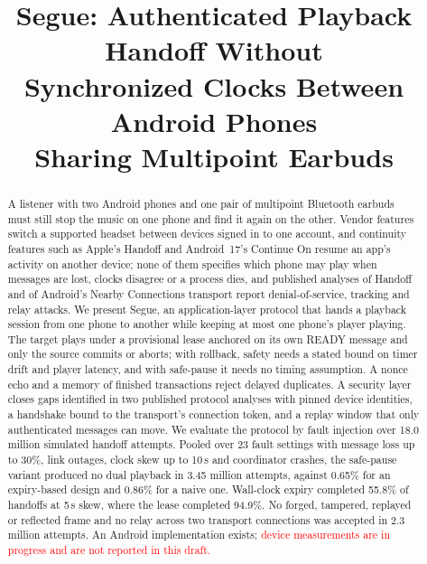 \documentclass[conference]{IEEEtran}
\newcommand{\draftnote}[1]{\textcolor{red}{#1}}
\begin{document}
\title{Segue: Authenticated Playback Handoff Without\\Synchronized Clocks Between Android Phones\\Sharing Multipoint Earbuds}

\author{
}

\maketitle

\begin{abstract}
A listener with two Android phones and one pair of multipoint Bluetooth earbuds must still stop the music on one phone and find it again on the other. Vendor features switch a supported headset between devices signed in to one account, and continuity features such as Apple's Handoff and Android~17's Continue On resume an app's activity on another device; none of them specifies which phone may play when messages are lost, clocks disagree or a process dies, and published analyses of Handoff and of Android's Nearby Connections transport report denial-of-service, tracking and relay attacks. We present Segue, an application-layer protocol that hands a playback session from one phone to another while keeping at most one phone's player playing. The target plays under a provisional lease anchored on its own READY message and only the source commits or aborts; with rollback, safety needs a stated bound on timer drift and player latency, and with safe-pause it needs no timing assumption. A nonce echo and a memory of finished transactions reject delayed duplicates. A security layer closes gaps identified in two published protocol analyses with pinned device identities, a handshake bound to the transport's connection token, and a replay window that only authenticated messages can move. We evaluate the protocol by fault injection over 18.0 million simulated handoff attempts. Pooled over 23 fault settings with message loss up to 30\%, link outages, clock skew up to 10\,s and coordinator crashes, the safe-pause variant produced no dual playback in 3.45 million attempts, against 0.65\% for an expiry-based design and 0.86\% for a naive one. Wall-clock expiry completed 55.8\% of handoffs at 5\,s skew, where the lease completed 94.9\%. No forged, tampered, replayed or reflected frame and no relay across two transport connections was accepted in 2.3 million attempts. An Android implementation exists; \draftnote{device measurements are in progress and are not reported in this draft.}
\end{abstract}
\end{document}
